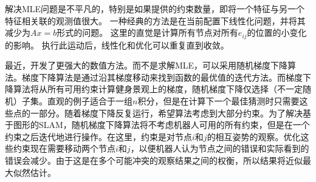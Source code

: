 解决MLE问题是不平凡的，特别是如果提供的约束数量，即将一个特征与另一个特征相关联的观测值很大。 一种经典的方法是在当前配置下线性化问题，并将其减少为$ Ax = b $形式的问题。 这里的直觉是计算所有节点对所有$ e_ {ij} $的位置的小变化的影响。 执行此运动后，线性化和优化可以重复直到收敛。


最近，开发了更强大的数值方法。而不是求解MLE，可以采用随机梯度下降算法。梯度下降算法是通过沿其梯度移动来找到函数的最优值的迭代方法。而梯度下降算法将从所有可用约束计算健身景观上的梯度，随机梯度下降仅选择（不一定随机）子集。直观的例子适合于一组$ n $积分，但是在计算下一个最佳猜测时只需要这些点的一部分。随着梯度下降反复运行，希望算法考虑到大部分约束。为了解决基于图形的SLAM，随机梯度下降算法将不考虑机器人可用的所有约束，但是在一个约束之后迭代地进行操作。在这里，约束是对节点$ i $和$ j $的相互姿势的观察。优化这些约束现在需要移动两个节点$ i $和$ j $，以便机器人认为节点之间的错误和实际看到的错误会减少。由于这是在多个可能冲突的观察结果之间的权衡，所以结果将近似最大似然估计。


